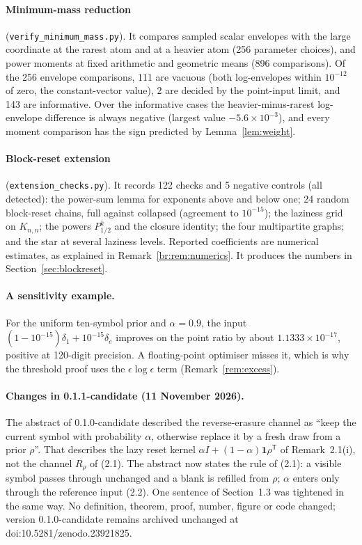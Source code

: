 \documentclass[11pt,a4paper]{article}
\numberwithin{equation}{section}
\theoremstyle{definition}
\theoremstyle{remark}
\newcommand{\one}{\mathbf 1}
\begin{document}
\paragraph{Minimum-mass reduction} (\texttt{verify\_minimum\_mass.py}).
It compares sampled scalar envelopes with the large coordinate at the
rarest atom and at a heavier atom (256 parameter choices), and power moments
at fixed arithmetic and geometric means (896 comparisons). Of the 256
envelope comparisons, 111 are vacuous (both log-envelopes within
\(10^{-12}\) of zero, the constant-vector value), 2 are decided by the
point-input limit, and 143 are informative. Over the informative cases the
heavier-minus-rarest log-envelope difference is always negative (largest
value \(-5.6\times10^{-3}\)), and every moment comparison has the sign
predicted by Lemma~\ref{lem:weight}.

\paragraph{Block-reset extension} (\texttt{extension\_checks.py}). It
records 122 checks and 5 negative controls (all detected): the power-sum
lemma for exponents above and below one; 24 random block-reset chains, full
against collapsed (agreement to \(10^{-15}\)); the laziness grid on
\(K_{n,n}\); the powers \(P_{1/2}^k\) and the closure identity; the four
multipartite graphs; and the star at several laziness levels. Reported
coefficients are numerical estimates, as explained in
Remark~\ref{br:rem:numerics}. It produces the numbers in
Section~\ref{sec:blockreset}.

\paragraph{A sensitivity example.} For the uniform ten-symbol prior and
\(\alpha=0.9\), the input \((1-10^{-15})\delta_1+10^{-15}\delta_e\)
improves on the point ratio by about \(1.1333\times10^{-17}\), positive at
120-digit precision. A floating-point optimiser misses it, which is why the
threshold proof uses the \(\epsilon\log\epsilon\) term
(Remark~\ref{rem:excess}).


\paragraph{Changes in 0.1.1-candidate (11 November 2026).} The abstract of
0.1.0-candidate described the reverse-erasure channel as ``keep the current
symbol with probability \(\alpha\), otherwise replace it by a fresh draw
from a prior \(\rho\)''. That describes the lazy reset kernel
\(\alpha I+(1-\alpha)\one\rho^{\mathsf T}\) of Remark~2.1(i), not the
channel \(R_\rho\) of (2.1). The abstract now states the rule of (2.1):
a visible symbol passes through unchanged and a blank is refilled from
\(\rho\); \(\alpha\) enters only through the reference input (2.2).
One sentence of Section~1.3 was tightened in the same way. No definition,
theorem, proof, number, figure or code changed; version 0.1.0-candidate
remains archived unchanged at doi:10.5281/zenodo.23921825.


\end{document}
